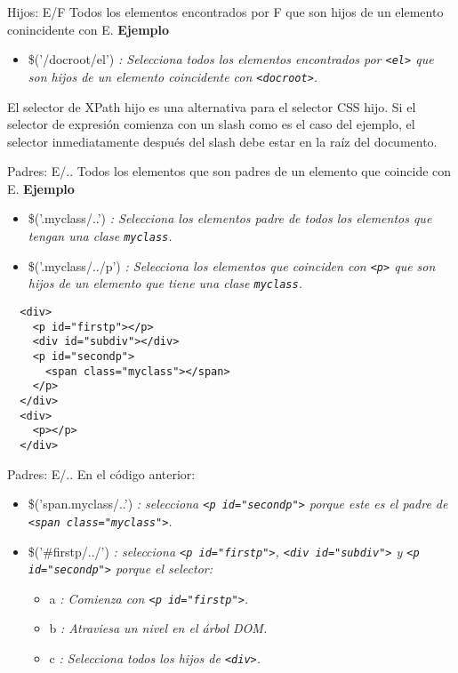 \begin{frame}[fragile]{Hijos: E/F} %
Todos los elementos encontrados por F que son hijos de un elemento
conincidente con E.
\textbf{Ejemplo}
\begin{itemize}
    \item \$('/docroot/el') \textit{: Selecciona todos los elementos
    encontrados por \texttt{<el>} que son hijos de un elemento coincidente con
    \texttt{<docroot>}.}
\end{itemize}
El selector de XPath hijo es una alternativa para el selector CSS hijo. Si el
selector de expresión comienza con un slash como es el caso del ejemplo,  el
selector inmediatamente después del slash debe estar en la raíz del documento. 
\end{frame}

\begin{frame}[fragile]{Padres: E/..} %
Todos los elementos que son padres de un elemento que coincide con E.
\textbf{Ejemplo}
\begin{itemize}
    \item \$('.myclass/..') \textit{: Selecciona los elementos padre de todos
    los elementos que tengan una clase \texttt{myclass}.}
    \item \$('.myclass/../p') \textit{: Selecciona los elementos que coinciden
    con \texttt{<p>} que son hijos de un elemento que tiene una clase
    \texttt{myclass}.}
\end{itemize}
\begin{lstlisting}
  <div>
    <p id="firstp"></p>
    <div id="subdiv"></div>
    <p id="secondp">
      <span class="myclass"></span>
    </p>
  </div>
  <div>
    <p></p>
  </div>
\end{lstlisting}
\end{frame}

\begin{frame}[fragile]{Padres: E/..} %
En el código anterior:
\begin{itemize}
    \item \$('span.myclass/..') \textit{: selecciona \texttt{<p id="secondp"\/>} porque este es el padre de \texttt{<span class="myclass"\/>}.}
    \item \$('\#firstp/../') \textit{: selecciona \texttt{<p id="firstp"\/>}, \texttt{<div id="subdiv"\/>} y \texttt{<p id="secondp"\/>} porque el selector:}
    \begin{itemize}
        \item a \textit{: Comienza con \texttt{<p id="firstp"\/>}.}
        \item b \textit{: Atraviesa un nivel en el árbol DOM.}
        \item c \textit{: Selecciona todos los hijos de \texttt{<div>}.}
    \end{itemize}
\end{itemize}
\end{frame}

